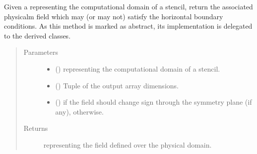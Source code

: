 \documentclass[letterpaper,10pt,english]{sphinxmanual}
\begin{document}
\begin{fulllineitems}
\begin{fulllineitems}
\begin{quote}
\begin{description}
\end{description}\end{quote}

\end{fulllineitems}


\begin{fulllineitems}
\label{\detokenize{api:dycore.horizontal_boundary.HorizontalBoundary.from_computational_to_physical_domain}}
Given a  representing the computational domain of a stencil, return the
associated physicalm field which may (or may not) satisfy the horizontal boundary conditions.
As this method is marked as abstract, its implementation is delegated to the derived classes.
\begin{quote}\begin{description}
\item[{Parameters}] \leavevmode\begin{itemize}
\item {} 
 () \textendash{}  representing the computational domain of a stencil.

\item {} 
 () \textendash{} Tuple of the output array dimensions.

\item {} 
 () \textendash{}  if the field should change sign through the symmetry plane (if any),  otherwise.

\end{itemize}

\item[{Returns}] \leavevmode
{} representing the field defined over the physical domain.


\end{description}
\end{quote}
\end{fulllineitems}
\end{fulllineitems}
\end{document}
